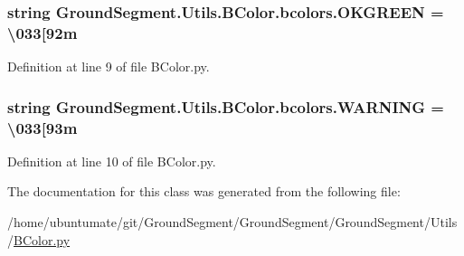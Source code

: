 \subsubsection[{O\+K\+G\+R\+E\+E\+N}]{\setlength{\rightskip}{0pt plus 5cm}string Ground\+Segment.\+Utils.\+B\+Color.\+bcolors.\+O\+K\+G\+R\+E\+E\+N = \textquotesingle{}\textbackslash{}033\mbox{[}92m\textquotesingle{}\hspace{0.3cm}{\ttfamily [static]}}\label{class_ground_segment_1_1_utils_1_1_b_color_1_1bcolors_a9d7eeaef6362cdddd1046170f2eadafc}


Definition at line 9 of file B\+Color.\+py.

\hypertarget{class_ground_segment_1_1_utils_1_1_b_color_1_1bcolors_a97624f8312073a262adc7eb1adca603a}{}
\subsubsection[{W\+A\+R\+N\+I\+N\+G}]{\setlength{\rightskip}{0pt plus 5cm}string Ground\+Segment.\+Utils.\+B\+Color.\+bcolors.\+W\+A\+R\+N\+I\+N\+G = \textquotesingle{}\textbackslash{}033\mbox{[}93m\textquotesingle{}\hspace{0.3cm}{\ttfamily [static]}}\label{class_ground_segment_1_1_utils_1_1_b_color_1_1bcolors_a97624f8312073a262adc7eb1adca603a}


Definition at line 10 of file B\+Color.\+py.



The documentation for this class was generated from the following file\+:\begin{DoxyCompactItemize}
\item 
/home/ubuntumate/git/\+Ground\+Segment/\+Ground\+Segment/\+Ground\+Segment/\+Utils/\hyperlink{_b_color_8py}{B\+Color.\+py}\end{DoxyCompactItemize}
